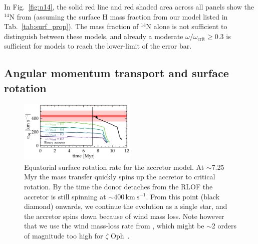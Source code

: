 \documentclass[twocolumn,twocolappendix,trackchanges]{aastex63}
\newcommand{\kms}{{\mathrm{km\ s^{-1}}}}
\DeclareRobustCommand{\Figref}[1]{Fig.~\ref{#1}}
\DeclareRobustCommand{\Tabref}[1]{Tab.~\ref{#1}}
\newcommand{\zoph}{$\zeta$ Oph}
\begin{document}
In \Figref{fig:n14}, the solid red line and red shaded area across all panels show the
$^{14}\mathrm{N}$ from  (assuming the
surface H mass fraction from our model listed in
\Tabref{tab:surf_prop}). The mass fraction of $^{14}\mathrm{N}$
alone is not sufficient to distinguish between these models, and already
a moderate $\omega/\omega_\mathrm{crit}\geq0.3$ is sufficient for
models to reach the lower-limit of the error bar.


\subsection{Angular momentum transport and surface rotation}
\label{sec:rot}

\begin{figure}[htbp]
  \includegraphics[width=0.5\textwidth]{zeta_rot}
  \caption{Equatorial surface rotation rate for the accretor model. At
    $\sim$7.25\,Myr the mass transfer quickly spins up the accretor to
    critical rotation. By the time the donor detaches from the RLOF
    the accretor is still spinning at
    $\sim$$400\,\kms$. From this point (black diamond) onwards, we continue the evolution as a single star, and the accretor spins down because of wind mass loss. Note however that we use the wind mass-loss rate from \cite{vink:01}, which might be
    $\sim$2 orders of magnitude too high for \zoph\ \citep{marcolino:09}.
  }
  \label{fig:surf_rot}
\end{figure}
\end{document}
